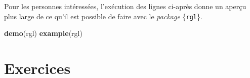 \documentclass[
  11pt,
]{book}
\newenvironment{Shaded}{\begin{snugshade}}{\end{snugshade}}
\newcommand{\DataTypeTok}[1]{\textcolor[rgb]{0.13,0.29,0.53}{#1}}
\newcommand{\DecValTok}[1]{\textcolor[rgb]{0.00,0.00,0.81}{#1}}
\newcommand{\FloatTok}[1]{\textcolor[rgb]{0.00,0.00,0.81}{#1}}
\newcommand{\KeywordTok}[1]{\textcolor[rgb]{0.13,0.29,0.53}{\textbf{#1}}}
\newcommand{\NormalTok}[1]{#1}
\newcommand{\OperatorTok}[1]{\textcolor[rgb]{0.81,0.36,0.00}{\textbf{#1}}}
\newcommand{\StringTok}[1]{\textcolor[rgb]{0.31,0.60,0.02}{#1}}
\numberwithin{equation}{section}
\numberwithin{countremarque}{section}
\newcounter{exercices}[section]
\begin{document}
\begin{Shaded}
\end{Shaded}

Pour les personnes intéressées, l'exécution des lignes ci-après donne un aperçu plus large de ce qu'il est possible de faire avec le \emph{package} \{\texttt{rgl}\}.

\begin{Shaded}
\begin{Highlighting}[]
\KeywordTok{demo}\NormalTok{(rgl)}
\KeywordTok{example}\NormalTok{(rgl)}
\end{Highlighting}
\end{Shaded}

\hypertarget{graphiques_exercices}{%
\section{Exercices}\label{graphiques_exercices}}
\end{document}
